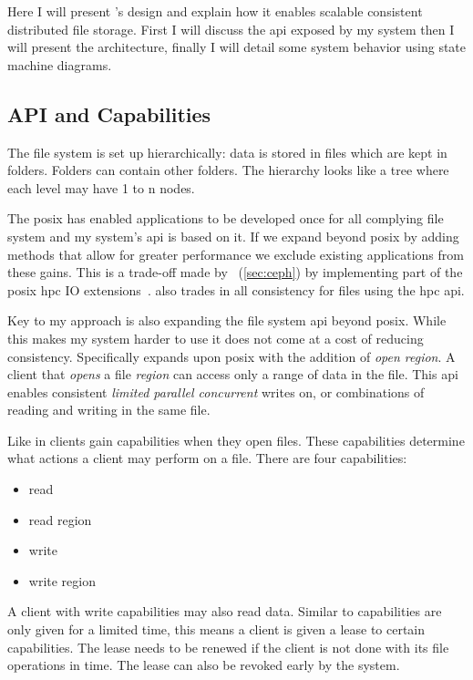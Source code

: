 Here I will present \name{}'s design and explain how it enables scalable consistent distributed file storage. First I will discuss the \ac{api} exposed by my system then I will present the architecture, finally I will detail some system behavior using state machine diagrams. 
%
\subsection{API and Capabilities}
The file system is set up hierarchically: data is stored in files which are kept in folders. Folders can contain other folders. The hierarchy looks like a tree where each level may have 1 to n nodes.

The \ac{posix} has enabled applications to be developed once for all complying file system and my system's \ac{api} is based on it. If we expand beyond \ac{posix} by adding methods that allow for greater performance we exclude existing applications from these gains. This is a trade-off made by \ceph{}~(\cref{sec:ceph}) by implementing part of the \ac{posix} \ac{hpc} IO extensions~\cite{hpc_posix}. \ceph{} also trades in all consistency for files using the \ac{hpc} \ac{api}. 

Key to my approach is also expanding the file system \ac{api} beyond \ac{posix}. While this makes my system harder to use it does not come at a cost of reducing consistency. Specifically \name{} expands upon \ac{posix} with the addition of \textsl{open region}. A client that \textit{opens} a file \textit{region} can access only a range of data in the file. This \ac{api} enables consistent \emph{limited parallel concurrent} writes on, or combinations of reading and writing in the same file.

Like \ceph{} in \name{} clients gain capabilities when they open files. These capabilities determine what actions a client may perform on a file. There are four capabilities: \nopagebreak
%
\begin{multicols}{4} %
\begin{itemize}
	\item read
	\item read region
	\item write
	\item write region
\end{itemize}
\end{multicols}
%
A client with write capabilities may also read data. Similar to \ceph{} capabilities are only given for a limited time, this means a client is given a lease to certain capabilities. The lease needs to be renewed if the client is not done with its file operations in time. The lease can also be revoked early by the system.

